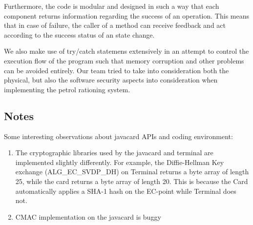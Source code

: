 \documentclass[a4paper,10pt]{llncs}
\begin{document}
Furthermore, the code is modular and designed in such a way that each component returns information regarding the success of an operation. This means that in case of failure, the caller of a method can receive feedback and act according to the success status of an state change.

We also make use of try/catch statemens extensively in an attempt to control the execution flow of the program such that memory corruption and other problems can be avoided entirely. Our team tried to take into consideration both the physical, but also the software security aspects into consideration when implementing the petrol rationing system.

\subsection{Notes}
Some interesting observations about javacard APIs and coding environment:

\begin{enumerate}
 \item The cryptographic libraries used by the javacard and terminal are implemented slightly differently. For example, the Diffie-Hellman Key exchange (ALG\_EC\_SVDP\_DH) on Terminal returns a byte array of length 25, while the card returns a byte array of length 20. This is because the Card automatically applies a SHA-1 hash on the EC-point while Terminal does not.
 \item CMAC implementation on the javacard is buggy
\end{enumerate}
\end{document}
